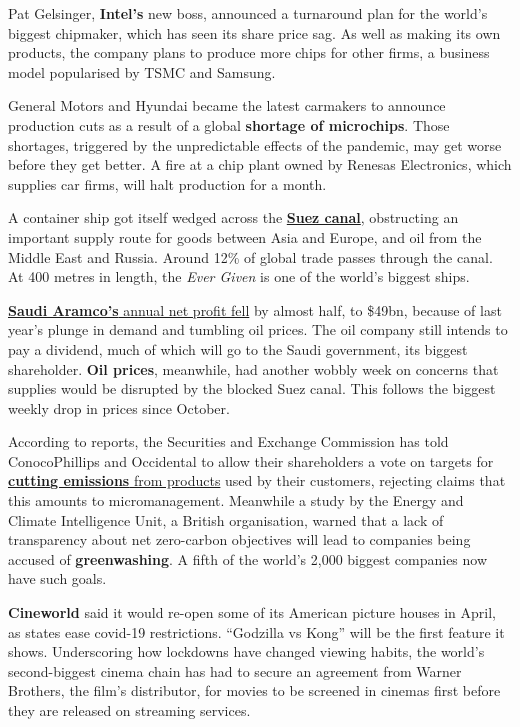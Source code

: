 \documentclass{article}
\begin{document}
Pat Gelsinger, \textbf{Intel's} new boss, announced a turnaround plan for the world's biggest chipmaker, which has seen its share price sag. As well as making its own products, the company plans to produce more chips for other firms, a business model popularised by TSMC and Samsung. 

General Motors and Hyundai became the latest carmakers to announce production cuts as a result of a global \textbf{shortage of microchips}. Those shortages, triggered by the unpredictable effects of the pandemic, may get worse before they get better. A fire at a chip plant owned by Renesas Electronics, which supplies car firms, will halt production for a month. 

A container ship got itself wedged across the \href{/node/21799686}{\textbf{Suez canal}}, obstructing an important supply route for goods between Asia and Europe, and oil from the Middle East and Russia. Around 12\% of global trade passes through the canal. At 400 metres in length, the \emph{Ever Given} is one of the world's biggest ships. 

\href{/node/21799702}{\textbf{Saudi Aramco's} annual net profit fell} by almost half, to \$49bn, because of last year's plunge in demand and tumbling oil prices. The oil company still intends to pay a dividend, much of which will go to the Saudi government, its biggest shareholder. \textbf{Oil prices}, meanwhile, had another wobbly week on concerns that supplies would be disrupted by the blocked Suez canal. This follows the biggest weekly drop in prices since October. 

According to reports, the Securities and Exchange Commission has told ConocoPhillips and Occidental to allow their shareholders a vote on targets for \href{/node/21799741}{\textbf{cutting emissions} from products} used by their customers, rejecting claims that this amounts to micromanagement. Meanwhile a study by the Energy and Climate Intelligence Unit, a British organisation, warned that a lack of transparency about net zero-carbon objectives will lead to companies being accused of \textbf{greenwashing}. A fifth of the world's 2,000 biggest companies now have such goals. 

\textbf{Cineworld} said it would re-open some of its American picture houses in April, as states ease covid-19 restrictions. ``Godzilla vs Kong'' will be the first feature it shows. Underscoring how lockdowns have changed viewing habits, the world's second-biggest cinema chain has had to secure an agreement from Warner Brothers, the film's distributor, for movies to be screened in cinemas first before they are released on streaming services. 
\end{document}
